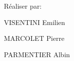 Réaliser par\+:


\begin{DoxyItemize}
\item V\+I\+S\+E\+N\+T\+I\+NI Emilien
\item M\+A\+R\+C\+O\+L\+ET Pierre
\item P\+A\+R\+M\+E\+N\+T\+I\+ER Albin 
\end{DoxyItemize}